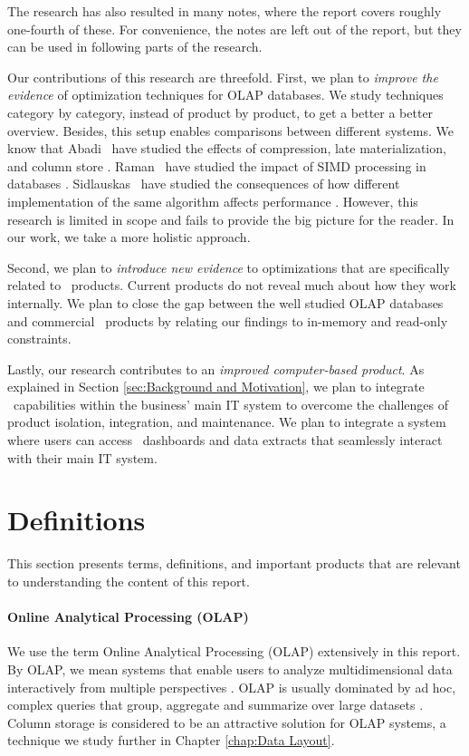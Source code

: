 The research has also resulted in many notes, where the report covers roughly one-fourth of these. For convenience, the notes are left out of the report, but they can be used in following parts of the research.

Our contributions of this research are threefold. First, we plan to \textit{improve the evidence} of optimization techniques for OLAP databases. We study techniques category by category, instead of product by product, to get a better a better overview. Besides, this setup enables comparisons between different systems. We know that Abadi \ea~have studied the effects of compression, late materialization, and column store \cite{Abadi2008-dd}. Raman \ea~have studied the impact of SIMD processing in databases \cite{Raman2008-gi}. Sidlauskas \ea~have studied the consequences of how different implementation of the same algorithm affects performance \cite{Sidlauskas2014-ef}. However, this research is limited in scope and fails to provide the big picture for the reader. In our work, we take a more holistic approach.

Second, we plan to \textit{introduce new evidence} to optimizations that are specifically related to \bd~products. Current products do not reveal much about how they work internally. We plan to close the gap between the well studied OLAP databases and commercial \bd~products by relating our findings to in-memory and read-only constraints.

Lastly, our research contributes to an \textit{improved computer-based product}. As explained in Section \ref{sec:Background and Motivation}, we plan to integrate \bd~capabilities within the business' main IT system to overcome the challenges of product isolation, integration, and maintenance. We plan to integrate a system where users can access \bd~dashboards and data extracts that seamlessly interact with their main IT system.

\section{Definitions}
\label{sec:Definitions}

This section presents terms, definitions, and important products that are relevant to understanding the content of this report.

\paragraph{Online Analytical Processing (OLAP)}
\label{par:Online Analytical Processing (OLAP)}
  We use the term Online Analytical Processing (OLAP) extensively in this report. By OLAP, we mean systems that enable users to analyze multidimensional data interactively from multiple perspectives \cite{Wikipedia_contributors2015-hw}. OLAP is usually dominated by ad hoc, complex queries that group, aggregate and summarize over large datasets \cite{Bjorklund2011-wh}. Column storage is considered to be an attractive solution for OLAP systems, a technique we study further in Chapter \ref{chap:Data Layout}.



